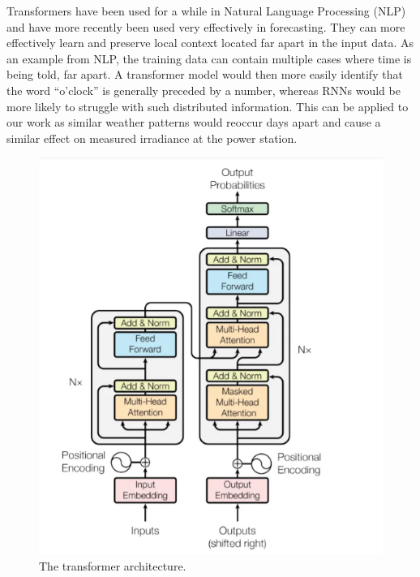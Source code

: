 Transformers have been used for a while in Natural Language Processing (NLP) and have more recently been used very effectively in forecasting.\cite{vaswani_attention_2017} They can more effectively learn and preserve local context located far apart in the input data. As an example from NLP, the training data can contain multiple cases where time is being told, far apart. A transformer model would then more easily identify that the word “o’clock” is generally preceded by a number, whereas RNNs would be more likely to struggle with such distributed information. This can be applied to our work as similar weather patterns would reoccur days apart and cause a similar effect on measured irradiance at the power station.

\begin{figure}[ht!]
    \centering
    \includegraphics[scale=0.7]{imgs/transformer.png}
    \caption{The transformer architecture.\cite{vaswani_attention_2017}
    \label{fig:transformer}}
\end{figure}



